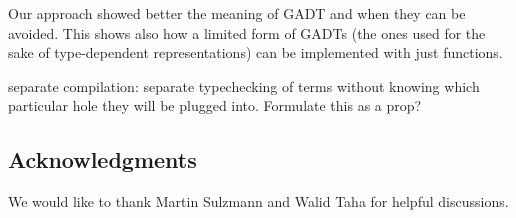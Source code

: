 \documentclass[preprint]{sigplanconf}
\begin{document}
Our approach showed better the meaning of GADT and when they can be
avoided.
This shows also how a limited form of GADTs (the ones
used for the sake of type-dependent representations) can be
implemented with just functions. 

separate compilation: separate
typechecking of terms without knowing which particular
hole they will be plugged into. Formulate this as a prop?



\subsection*{Acknowledgments}
We would like to thank Martin Sulzmann and Walid Taha 
for helpful discussions.



\end{document}
